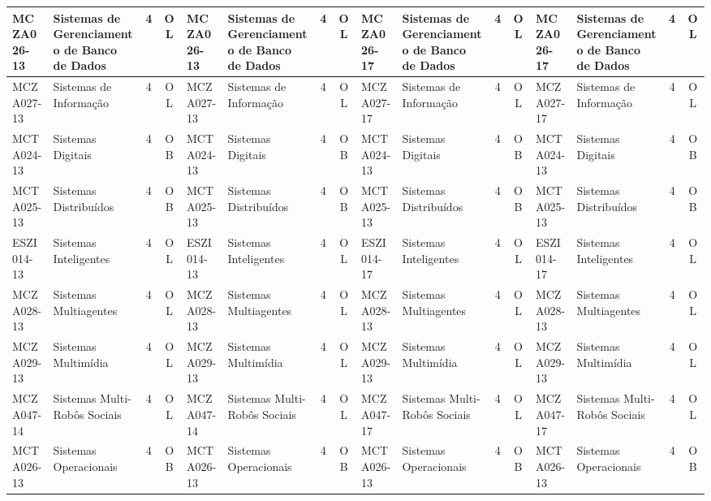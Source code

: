 \documentclass[a4paper]{article}
\begin{document}
\begin{landscape}
{\begin{longtable}{|l|p{.15\textheight}|c|c||l|p{.15\textheight}|c|c||l|p{.15\textheight}|c|c||l|p{.15\textheight}|c|c|}
    MCZA026-13 & Sistemas de Gerenciamento de Banco de Dados & 4 & OL &
    MCZA026-13 & Sistemas de Gerenciamento de Banco de Dados & 4 & OL &
    MCZA026-17 & Sistemas de Gerenciamento de Banco de Dados & 4 & OL & 
    MCZA026-17 & Sistemas de Gerenciamento de Banco de Dados & 4 & OL \\ \hline

    MCZA027-13 & Sistemas de Informação & 4 & OL &
    MCZA027-13 & Sistemas de Informação & 4 & OL &
    MCZA027-17 & Sistemas de Informação & 4 & OL &
    MCZA027-17 & Sistemas de Informação & 4 & OL \\ \hline

    MCTA024-13 & Sistemas Digitais & 4 & OB &
    MCTA024-13 & Sistemas Digitais & 4 & OB &
    MCTA024-13 & Sistemas Digitais & 4 & OB &
    MCTA024-13 & Sistemas Digitais & 4 & OB \\ \hline

    MCTA025-13 & Sistemas Distribuídos & 4 & OB &
    MCTA025-13 & Sistemas Distribuídos & 4 & OB &
    MCTA025-13 & Sistemas Distribuídos & 4 & OB &
    MCTA025-13 & Sistemas Distribuídos & 4 & OB\\ \hline

    ESZI014-13 & Sistemas Inteligentes & 4 & OL &
    ESZI014-13 & Sistemas Inteligentes & 4 & OL &
    ESZI014-17 & Sistemas Inteligentes & 4 & OL & 
    ESZI014-17 & Sistemas Inteligentes & 4 & OL \\ \hline

    MCZA028-13 & Sistemas Multiagentes & 4 & OL &
    MCZA028-13 & Sistemas Multiagentes & 4 & OL &
    MCZA028-13 & Sistemas Multiagentes & 4 & OL &
    MCZA028-13 & Sistemas Multiagentes & 4 & OL \\ \hline

    MCZA029-13 & Sistemas Multimídia & 4 & OL &
    MCZA029-13 & Sistemas Multimídia & 4 & OL &
    MCZA029-13 & Sistemas Multimídia & 4 & OL &
    MCZA029-13 & Sistemas Multimídia & 4 & OL \\ \hline

    MCZA047-14 & Sistemas Multi-Robôs Sociais & 4 & OL &
    MCZA047-14 & Sistemas Multi-Robôs Sociais & 4 & OL &
    MCZA047-17 & Sistemas Multi-Robôs Sociais & 4 & OL &
    MCZA047-17 & Sistemas Multi-Robôs Sociais & 4 & OL \\ \hline
   
    MCTA026-13 & Sistemas Operacionais & 4 & OB & 
    MCTA026-13 & Sistemas Operacionais & 4 & OB & 
    MCTA026-13 & Sistemas Operacionais & 4 & OB & 
    MCTA026-13 & Sistemas Operacionais & 4 & OB \\ \hline


\end{longtable}}
\end{landscape}
\end{document}
